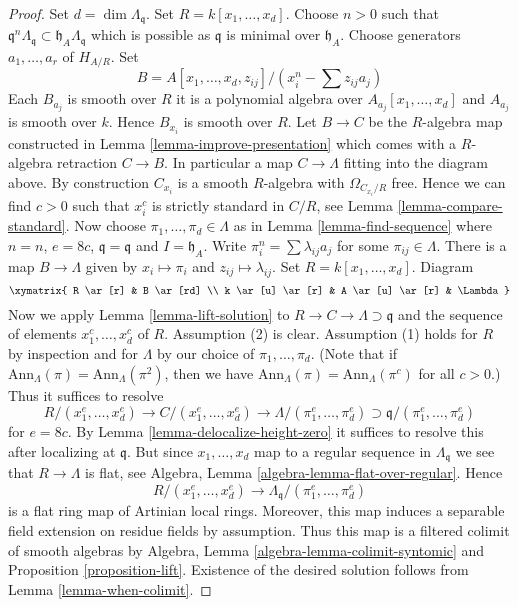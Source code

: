 \begin{proof}
Set $d = \dim \Lambda_\mathfrak q$. Set $R = k[x_1, \ldots, x_d]$.
Choose $n > 0$ such that
$\mathfrak q^n\Lambda_\mathfrak q \subset \mathfrak h_A\Lambda_\mathfrak q$
which is possible as $\mathfrak q$ is minimal over $\mathfrak h_A$.
Choose generators $a_1, \ldots, a_r$ of $H_{A/R}$. Set
$$
B = A[x_1, \ldots, x_d, z_{ij}]/(x_i^n - \sum z_{ij}a_j)
$$
Each $B_{a_j}$ is smooth over $R$ it is a polynomial
algebra over $A_{a_j}[x_1, \ldots, x_d]$ and $A_{a_j}$ is smooth over $k$.
Hence $B_{x_i}$ is smooth over $R$. Let $B \to C$ be the $R$-algebra
map constructed in Lemma \ref{lemma-improve-presentation}
which comes with a $R$-algebra retraction $C \to B$. In particular
a map $C \to \Lambda$ fitting into the diagram above.
By construction $C_{x_i}$ is a smooth $R$-algebra with
$\Omega_{C_{x_i}/R}$ free. Hence we can find $c > 0$
such that $x_i^c$ is strictly standard in $C/R$, see
Lemma \ref{lemma-compare-standard}.
Now choose $\pi_1, \ldots, \pi_d \in \Lambda$ as in
Lemma \ref{lemma-find-sequence}
where $n = n$, $e = 8c$, $\mathfrak q = \mathfrak q$ and $I = \mathfrak h_A$.
Write $\pi_i^n = \sum \lambda_{ij} a_j$ for some $\pi_{ij} \in \Lambda$.
There is a map $B \to \Lambda$ given by $x_i \mapsto \pi_i$
and $z_{ij} \mapsto \lambda_{ij}$. Set $R = k[x_1, \ldots, x_d]$.
Diagram
$$
\xymatrix{
R \ar[r] & B \ar[rd] \\
k \ar[u] \ar[r] & A \ar[u] \ar[r] & \Lambda
}
$$
Now we apply
Lemma \ref{lemma-lift-solution}
to $R \to C \to \Lambda \supset \mathfrak q$
and the sequence of elements $x_1^c, \ldots, x_d^c$ of $R$.
Assumption (2) is clear. Assumption (1) holds for $R$
by inspection and for $\Lambda$ by our choice of
$\pi_1, \ldots, \pi_d$. (Note that if
$\text{Ann}_\Lambda(\pi) = \text{Ann}_\Lambda(\pi^2)$, then we have
$\text{Ann}_\Lambda(\pi) = \text{Ann}_\Lambda(\pi^c)$ for all $c > 0$.)
Thus it suffices to resolve
$$
R/(x_1^e, \ldots, x_d^e) \to C/(x_1^e, \ldots, x_d^e) \to
\Lambda/(\pi_1^e, \ldots, \pi_d^e) \supset
\mathfrak q/(\pi_1^e, \ldots, \pi_d^e)
$$
for $e = 8c$. By
Lemma \ref{lemma-delocalize-height-zero}
it suffices to resolve this after localizing at $\mathfrak q$.
But since $x_1, \ldots, x_d$ map to a regular sequence
in $\Lambda_\mathfrak q$ we see that $R \to \Lambda$ is flat, see
Algebra, Lemma \ref{algebra-lemma-flat-over-regular}. Hence
$$
R/(x_1^e, \ldots, x_d^e) \to 
\Lambda_\mathfrak q/(\pi_1^e, \ldots, \pi_d^e)
$$
is a flat ring map of Artinian local rings.
Moreover, this map induces a separable field extension
on residue fields by assumption. Thus this map is a filtered colimit
of smooth algebras by
Algebra, Lemma \ref{algebra-lemma-colimit-syntomic}
and Proposition \ref{proposition-lift}.
Existence of the desired solution follows from
Lemma \ref{lemma-when-colimit}.
\end{proof}






